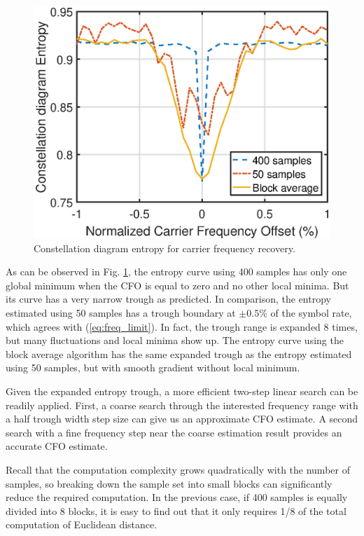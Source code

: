 \documentclass[journal,comsoc,onecolumn, 12pt,draftclsnofoot]{IEEEtran}
\begin{document}
\begin{figure}[ht]
\centering
\includegraphics[width=3 in]{pic/freq.eps}
\caption{Constellation diagram entropy for carrier frequency recovery.}
\label{fig:freq_entp} 
\end{figure}   

As can be observed in Fig. \ref{fig:freq_entp}, the entropy curve using 400 samples has only one global minimum when the CFO is equal to zero and no other local minima.
But its curve has a very narrow trough as predicted.
In comparison, the entropy estimated using 50 samples has a trough boundary at \(\pm 0.5\%\) of the symbol rate, which agrees with (\ref{eq:freq_limit}).
In fact, the trough range is expanded 8 times, but many fluctuations and local minima show up.
The entropy curve using the block average algorithm has the same expanded trough as the entropy estimated using 50 samples, but with smooth gradient without local minimum.

Given the expanded entropy trough, a more efficient two-step linear search can be readily applied.
First, a coarse search through the interested frequency range with a half trough width step size can give us an approximate CFO estimate.
A second search with a fine frequency step near the coarse estimation result provides an accurate CFO estimate.

Recall that the computation complexity grows quadratically with the number of samples, so breaking down the sample set into small blocks can significantly reduce the required computation.
In the previous case, if 400 samples is equally divided into 8 blocks, it is easy to find out that it only requires 1/8 of the total computation of Euclidean distance. 

\end{document}
